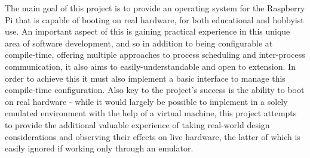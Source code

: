     The main goal of this project is to provide an operating system for the
    Raspberry Pi that is capable of booting on real hardware, for both
    educational and hobbyist use. An important aspect of this is gaining
    practical experience in this unique area of software development, and so in
    addition to being configurable at compile-time, offering multiple approaches
    to process scheduling and inter-process communication, it also aims to
    easily-understandable and open to extension. In order to achieve this it
    must also implement a basic interface to manage this compile-time
    configuration. Also key to the project's success is the ability to boot on
    real hardware - while it would largely be possible to implement in a solely
    emulated environment with the help of a virtual machine, this project
    attempts to provide the additional valuable experience of taking real-world
    design considerations and observing their effects on live hardware, the
    latter of which is easily ignored if working only through an emulator. 

